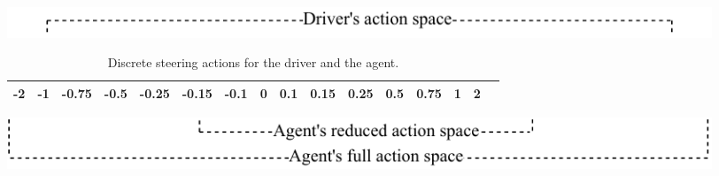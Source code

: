 \begin{table}[htbp]
\footnotesize
\centering
\centerfloat
\setlength{\tabcolsep}{5pt}
\includegraphics[width=0.925\textwidth]{figures/driver-actions.pdf}
\begin{tabular}{cccccccccccccccc}
\toprule
 -2 & -1     & -0.75  & -0.5   & -0.25  & -0.15  & -0.1   & 0     & 0.1   & 0.15  & 0.25  & 0.5   & 0.75  & 1 & 2 \\ \bottomrule
\end{tabular}
\includegraphics[width=0.925\textwidth]{figures/agent-actions.pdf}
\caption[Discrete steering actions for the driver and the agent]{Discrete steering actions for the driver and the agent.}
\label{tab:actions}
\end{table} 